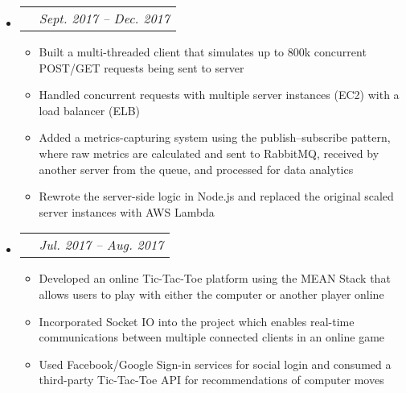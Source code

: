 \documentclass[letterpaper,11pt]{article}
\makeatletter
\newcommand{\resitem}[1]{
    \item #1
    \vspace{-2pt}
}
\newcommand{\ressubheadingproj}[2]{
\begin{tabular*}{6.80in}{l@{\extracolsep{\fill}}r}
    \textbf{#1} & \textit{#2} \\
\end{tabular*}\vspace{-6pt}}
\makeatother
\begin{document}
    \begin{itemize}
        \item\ressubheadingproj
        {\href
        {https://github.com/jeremylinlin/cs6650-scalable-distributed-systems}
        {Distributed Ski Data Processing Engine}
        }
        {Sept. 2017 -- Dec. 2017}
        {\footnotesize
        \begin{itemize}
            \resitem
            {Built a multi-threaded client that simulates up to 800k concurrent POST/GET
            requests being sent to server}
            \resitem
            {Handled concurrent requests with multiple server instances (EC2)
            with a load balancer (ELB)}
            \resitem
            {Added a metrics-capturing system using the publish--subscribe pattern, where
            raw metrics are calculated and sent to RabbitMQ, received by another server
            from the queue, and processed for data analytics}
            \resitem
            {Rewrote the server-side logic in Node.js and replaced the original scaled server
            instances with AWS Lambda}

        \end{itemize}
        }
    \end{itemize}

    \begin{itemize}
        \item\ressubheadingproj
        {\href
        {https://github.com/jeremylinlin/tic-tac-toe-mean}
        {Multiplayer Tic-Tac-Toe Game Platform}
        }
        {Jul. 2017 -- Aug. 2017}
        {\footnotesize
        \begin{itemize}
            \resitem
            {Developed an online Tic-Tac-Toe platform using the MEAN Stack that allows
            users to play with either the computer or another player online}
            \resitem
            {Incorporated Socket IO into the project which enables real-time
            communications between multiple connected clients in an online game}
            \resitem
            {Used Facebook/Google Sign-in services for social login and consumed a
            third-party Tic-Tac-Toe API for recommendations of computer moves}
        \end{itemize}
        }
    \end{itemize}
\end{document}
